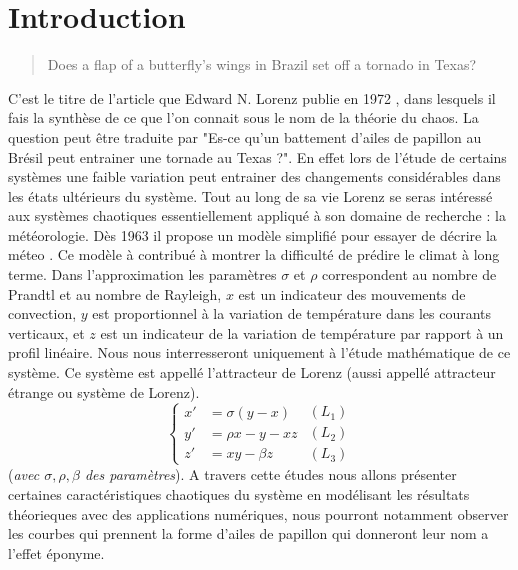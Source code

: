 \documentclass{article}
\newtheorem[M , nocut]{prop}{Proposition}[section]
\newtheorem[S , nocut]{definition}{Définition}
\newtheorem[S , nocut]{lemme}{Lemme}
\newtheorem[L , nocut]{thm}{Théoreme}
\newtheorem[L , nocut]{cor}{Corollaire}
\begin{document}
\section{Introduction}
\thispagestyle{empty}
\setcounter{page}{1}
\begin{quotation}
    Does a flap of a butterfly's wings in Brazil set off a tornado in Texas?
\end{quotation}
C'est le titre de l'article que Edward N. Lorenz publie en 1972 \cite{lorenz_does_1972}, dans lesquels il fais la synthèse de ce que l'on connait sous le nom de la théorie du chaos. La question peut être traduite par "Es-ce qu'un battement d'ailes de papillon au Brésil peut entrainer une tornade au Texas ?". En effet lors de l'étude de certains systèmes une faible variation peut entrainer des changements considérables dans les états ultérieurs du système. Tout au long de sa vie Lorenz se seras intéressé aux systèmes chaotiques essentiellement appliqué à son domaine de recherche : la météorologie. Dès 1963 il propose un modèle simplifié pour essayer de décrire la méteo \cite{lorenz_deterministic_1963}. Ce modèle à contribué à montrer la difficulté de prédire le climat à long terme. Dans l'approximation les paramètres $\sigma$ et $\rho$ correspondent au nombre de Prandtl et au nombre de Rayleigh, $x$ est un indicateur des mouvements de convection, $y$ est proportionnel à la variation de température dans les courants verticaux, et $z$ est un indicateur de la variation de température par rapport à un profil linéaire. Nous nous interresseront uniquement à l'étude mathématique de ce système. Ce système est appellé l'attracteur de Lorenz (aussi appellé attracteur étrange ou système de Lorenz).
\begin{equation}
    \label{Lorenz}
    \left\{
    \begin{array}{rl}
        x' &=\sigma(y-x) \\
        y' &=\rho x -y - xz\\
        z' &=xy - \beta z
    \end{array}
    \right.
    \begin{array}{r}
        (L_1)\\
        (L_2)\\
        (L_3)
    \end{array}
\end{equation}
(\textit{avec $\sigma,\rho,\beta$ des paramètres}).
A travers cette études nous allons présenter certaines caractéristiques chaotiques du système en modélisant les résultats théorieques avec des applications numériques, nous pourront notamment observer les courbes qui prennent la forme d'ailes de papillon qui donneront leur nom a l'effet éponyme.
   
\end{document}
